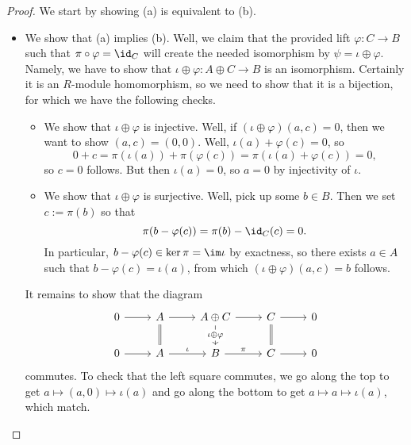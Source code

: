 \begin{proof}
	We start by showing (a) is equivalent to (b).
	\begin{itemize}
		\item We show that (a) implies (b). Well, we claim that the provided lift $\varphi:C\to B$ such that $\pi\circ\varphi=\id_C$ will create the needed isomorphism by $\psi=\iota\oplus\varphi$. Namely, we have to show that $\iota\oplus\varphi:A\oplus C\to B$ is an isomorphism. Certainly it is an $R$-module homomorphism, so we need to show that it is a bijection, for which we have the following checks.
		\begin{itemize}
			\item We show that $\iota\oplus\varphi$ is injective. Well, if $(\iota\oplus\varphi)(a,c)=0$, then we want to show $(a,c)=(0,0)$. Well, $\iota(a)+\varphi(c)=0$, so
			\[0+c=\pi(\iota(a))+\pi(\varphi(c))=\pi(\iota(a)+\varphi(c))=0,\]
			so $c=0$ follows. But then $\iota(a)=0$, so $a=0$ by injectivity of $\iota$.
			\item We show that $\iota\oplus\varphi$ is surjective. Well, pick up some $b\in B$. Then we set $c:=\pi(b)$ so that
			\[\pi(b-\varphi(c))=\pi(b)-\id_C(c)=0.\]
			In particular, $b-\varphi(c)\in\ker\pi=\im\iota$ by exactness, so there exists $a\in A$ such that $b-\varphi(c)=\iota(a)$, from which $(\iota\oplus\varphi)(a,c)=b$ follows.
		\end{itemize}
		It remains to show that the diagram
		\[\begin{tikzcd}
			0 & A & {A\oplus C} & C & 0 \\
			0 & A & B & C & 0
			\arrow[from=1-1, to=1-2]
			\arrow[from=1-2, to=1-3]
			\arrow[from=1-3, to=1-4]
			\arrow[from=1-4, to=1-5]
			\arrow[from=2-1, to=2-2]
			\arrow["\iota", from=2-2, to=2-3]
			\arrow["\pi", from=2-3, to=2-4]
			\arrow[from=2-4, to=2-5]
			\arrow[Rightarrow, no head, from=1-2, to=2-2]
			\arrow["\iota\oplus\varphi"{description}, from=1-3, to=2-3]
			\arrow[Rightarrow, no head, from=1-4, to=2-4]
		\end{tikzcd}\]
		commutes. To check that the left square commutes, we go along the top to get $a\mapsto(a,0)\mapsto\iota(a)$ and go along the bottom to get $a\mapsto a\mapsto\iota(a)$, which match.


\end{itemize}
\end{proof}

